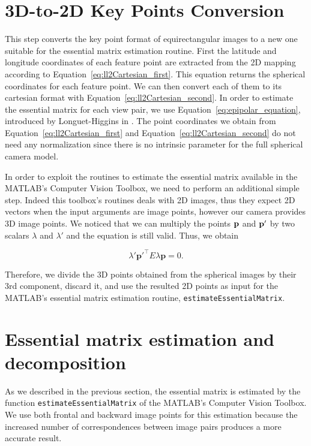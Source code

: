 \section{3D-to-2D Key Points Conversion}
\label{sec:keypoints_conversion}
This step converts the key point format of equirectangular images to a new one 
suitable for the essential matrix estimation routine.
First the latitude and longitude coordinates of each feature point are 
extracted from the 2D mapping according to  
Equation~\ref{eq:ll2Cartesian_first}.
This equation returns the spherical coordinates for each feature point. 
We can then convert each of them to its cartesian format with 
Equation~\ref{eq:ll2Cartesian_second}. In order to estimate the essential 
matrix for each view pair, we use Equation~\ref{eq:epipolar_equation}, 
introduced by Longuet-Higgins in \cite{longuet1981computer}.
The point coordinates we obtain from Equation~\ref{eq:ll2Cartesian_first} and
Equation~\ref{eq:ll2Cartesian_second} do not need any normalization since there
is no intrinsic parameter for the full spherical camera model.

In order to exploit the routines to estimate the essential matrix available 
in the MATLAB's Computer Vision Toolbox, we need to perform an additional simple 
step.
Indeed this toolbox's routines deals with 2D images, thus they expect 
2D vectors when the input arguments are image points, however our camera
provides 3D image points.
We noticed that we can multiply the points $\mathbf{p}$
and $\mathbf{p}'$ by two 
scalars ${\lambda}$ and 
${\lambda}'$ and the equation is still valid. Thus, we obtain

\begin{equation*}
\lambda'\mathbf{p}'^\top E\lambda\mathbf{p} = 0 \text{.}
\end{equation*}

Therefore, we divide the 3D points obtained from the spherical images by their 
3rd component, discard it, and use the resulted 2D points as input for the 
MATLAB's essential matrix estimation routine, {\tt estimateEssentialMatrix}.

\section{Essential matrix estimation and decomposition}
As we described in the previous section, the essential matrix is estimated 
by the function {\tt estimateEssentialMatrix} of the MATLAB's 
Computer Vision Toolbox.
We use both frontal and backward image points for this estimation because
the increased number of correspondences between image pairs produces 
a more accurate result.

